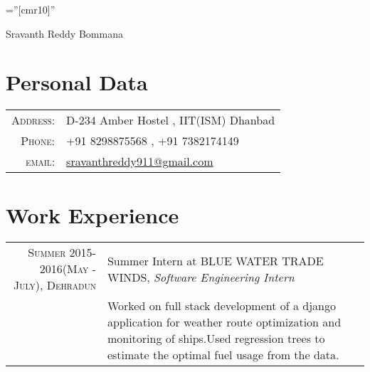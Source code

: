 \documentclass[a4paper,10pt]{article}
\begin{document}

\pagestyle{empty} %

\font\fb=''[cmr10]'' %

\par{\centering
		{\Huge Sravanth Reddy Bommana
	}\bigskip\par}

\section{Personal Data}

\begin{tabular}{rl}
    \textsc{Address:}   & D-234 Amber Hostel , IIT(ISM) Dhanbad \\
    \textsc{Phone:}     & +91 8298875568 , +91 7382174149\\
    \textsc{email:}     & \href{mailto:sravanthreddy911@gmail.com}{sravanthreddy911@gmail.com}\\
\end{tabular}

\section{Work Experience}
\begin{tabular}{r|p{7cm}}
\textsc{Summer 2015-2016(May - July), Dehradun} & Summer Intern at \textsc{BLUE WATER TRADE WINDS}, \emph{Software Engineering  Intern}\\&\footnotesize{Worked on full stack development of a django application for weather route
optimization and monitoring of ships.Used regression trees to estimate the optimal fuel usage from the data.}
\end{tabular}

\end{document}
